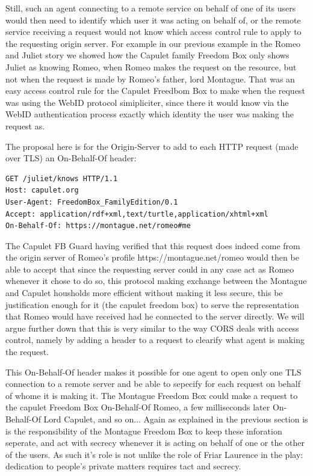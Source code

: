 \documentclass[a4paper]{llncs}
\begin{document}
Still, such an agent connecting to a remote service on behalf of one of its users would then need to identify which user it was acting on behalf of, or the remote service receiving a request would not know which access control rule to apply to the requesting origin server.
For example in our previous example in the Romeo and Juliet story we showed how the Capulet family Freedom Box only shows Juliet as knowing Romeo, when Romeo makes the request on the resource, but not when the request is made by Romeo's father, lord Montague.
That was an easy access control rule for the Capulet Freedbom Box to make when the request was using the WebID protocol simipliciter, since there it would know via the WebID authentication process exactly which identity the user was making the request as. 

The proposal here is for the Origin-Server to add to each HTTP request (made over TLS) an On-Behalf-Of header:

\begin{verbatim}
GET /juliet/knows HTTP/1.1
Host: capulet.org
User-Agent: FreedomBox_FamilyEdition/0.1 
Accept: application/rdf+xml,text/turtle,application/xhtml+xml
On-Behalf-Of: https://montague.net/romeo#me
\end{verbatim}

The Capulet FB Guard having verified that this request does indeed come from the origin server of Romeo's profile
https://montague.net/romeo would then be able to accept that since the requesting server could in any case act as Romeo whenever it chose to do so, this protocol making exchange between the Montague and Capulet housholds more efficient without making it less secure, this be justification enough for it (the capulet freedom box) to  serve the representation that Romeo would have received had he connected to the server directly.  
We will argue further down that this is very similar to the way CORS deals with access control, namely by adding a header to a request to clearify what agent is making the request.

This On-Behalf-Of header makes it possible for one agent to open only one TLS connection to a remote server and be 
able to sepecify for each request on behalf of whome it is making it. The Montague Freedom Box could make a request to the capulet Freedom Box On-Behalf-Of Romeo, a few milliseconds later On-Behalf-Of Lord Capulet, and so on... 
Again as explained in the previous section is is the responsibility of the Montague Freedom Box to keep these inforation seperate, and act with secrecy whenever it is acting on behalf of one or the other of the users. 
As such it's role is not unlike the role of Friar Laurence in the play: dedication to people's private matters requires tact and secrecy.
\end{document}

